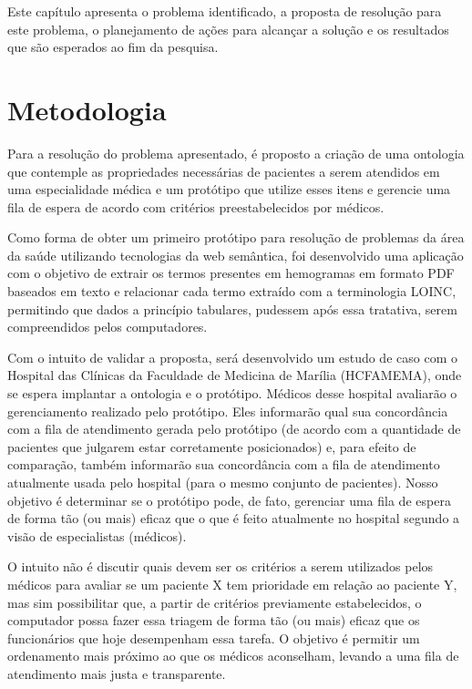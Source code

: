 Este capítulo apresenta o problema identificado, a proposta de resolução para este problema, o planejamento de ações para alcançar a solução e os resultados que são esperados ao fim da pesquisa.



\section{Metodologia}
\label{sec:methodology}

 Para a resolução do problema apresentado, é proposto a criação de uma ontologia que contemple as propriedades necessárias de pacientes a serem atendidos em uma especialidade médica e um protótipo que utilize esses itens e gerencie uma fila de espera de acordo com critérios preestabelecidos por médicos.
 
 Como forma de obter um primeiro protótipo para resolução de problemas da área da saúde utilizando tecnologias da web semântica, foi desenvolvido uma aplicação com o objetivo de extrair os termos presentes em hemogramas em formato PDF baseados em texto e relacionar cada termo extraído com a terminologia LOINC, permitindo que dados a princípio tabulares, pudessem após essa tratativa, serem compreendidos  pelos computadores.

    Com o intuito de validar a proposta, será desenvolvido um estudo de caso com o Hospital das Clínicas da Faculdade de Medicina de Marília (HCFAMEMA), onde se espera implantar a ontologia e o protótipo. Médicos desse hospital avaliarão o gerenciamento realizado pelo protótipo. Eles informarão qual sua concordância com a fila de atendimento gerada pelo protótipo (de acordo com a quantidade de pacientes que julgarem estar corretamente posicionados) e, para efeito de comparação, também informarão sua concordância com a fila de atendimento atualmente usada pelo hospital (para o mesmo conjunto de pacientes). Nosso objetivo é determinar se o protótipo pode, de fato, gerenciar uma fila de espera de forma tão (ou mais) eficaz que o que é feito atualmente no hospital segundo a visão de especialistas (médicos).
	
	O intuito não é discutir quais devem ser os critérios a serem utilizados pelos médicos para avaliar se um paciente X tem prioridade em relação ao paciente Y, mas sim possibilitar que, a partir de critérios previamente estabelecidos, o computador possa fazer essa triagem de forma tão (ou mais) eficaz que os funcionários que hoje desempenham essa tarefa. O objetivo é permitir um ordenamento mais próximo ao que os médicos aconselham, levando a uma fila de atendimento mais justa e transparente. 
	
